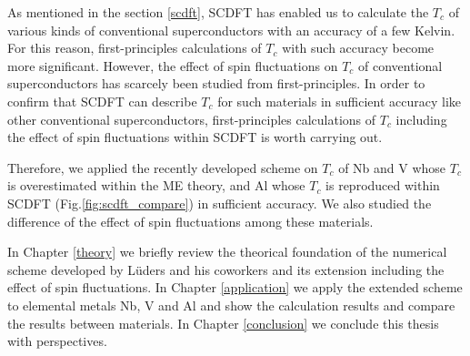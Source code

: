 As mentioned in the section \ref{scdft}, SCDFT has enabled us to calculate the $T_c$ of various kinds of conventional
superconductors with an accuracy of a few Kelvin. 
For this reason, first-principles calculations of $T_c$ with such accuracy become more significant.
However, the effect of spin fluctuations on $T_c$ of conventional superconductors has scarcely been 
studied from first-principles.
In order to confirm that SCDFT
can describe $T_c$ for such materials in sufficient accuracy like other conventional superconductors,
first-principles calculations of $T_c$ including the effect of spin fluctuations within SCDFT is 
worth carrying out.

Therefore, we applied the recently developed scheme\cite{Essenberger2014} on $T_c$ of Nb and V 
whose $T_c$ is overestimated within the ME theory, and Al whose $T_c$ is reproduced within 
SCDFT (Fig.\ref{fig:scdft_compare}) in sufficient accuracy. We also studied the difference of the 
effect of spin fluctuations among these materials.

In Chapter \ref{theory} we briefly review the theorical foundation of the numerical scheme 
developed by L\"{u}ders and his coworkers\cite{Luders2005} and its extension 
including the effect of spin fluctuations\cite{Essenberger2014}.
In Chapter \ref{application} we apply the extended scheme to elemental metals Nb, V and Al and show 
the calculation results and compare the results between materials.
In Chapter \ref{conclusion} we conclude this thesis with perspectives.


